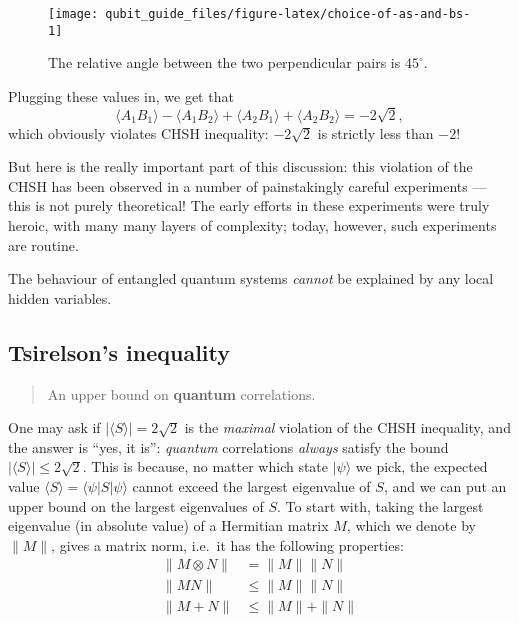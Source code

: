 \documentclass[fleqn]{article}
\newenvironment{idea}{\noindent}{\medskip}
\begin{document}
\begin{figure}[H]

{\centering \texttt{[image: qubit\_guide\_files/figure-latex/choice-of-as-and-bs-1]} 

}

\caption{The relative angle between the two perpendicular pairs is \(45^\circ\).}\label{fig:choice-of-as-and-bs}
\end{figure}

Plugging these values in, we get that
\[
  \langle A_1 B_1\rangle - \langle A_1 B_2\rangle + \langle A_2 B_1\rangle + \langle A_2 B_2\rangle
  = -2\sqrt{2},
\]
which obviously violates CHSH inequality: \(-2\sqrt{2}\) is strictly less than \(-2\)!

But here is the really important part of this discussion: this violation of the CHSH has been observed in a number of painstakingly careful experiments --- this is not purely theoretical!
The early efforts in these experiments were truly heroic, with many many layers of complexity; today, however, such experiments are routine.

\begin{idea}
The behaviour of entangled quantum systems \emph{cannot} be explained by any local hidden variables.

\end{idea}

\hypertarget{tsirelsons-inequality}{%
\subsection{Tsirelson's inequality}\label{tsirelsons-inequality}}

\begin{quote}
An upper bound on \textbf{quantum} correlations.
\end{quote}

One may ask if \(|\langle S\rangle|= 2\sqrt{2}\) is the \emph{maximal} violation of the CHSH inequality, and the answer is ``yes, it is'': \emph{quantum} correlations \emph{always} satisfy the bound \(|\langle S\rangle|\leqslant 2\sqrt{2}\).
This is because, no matter which state \(|\psi\rangle\) we pick, the expected value \(\langle S\rangle = \langle\psi|S|\psi\rangle\) cannot exceed the largest eigenvalue of \(S\), and we can put an upper bound on the largest eigenvalues of \(S\).
To start with, taking the largest eigenvalue (in absolute value) of a Hermitian matrix \(M\), which we denote by \(\|M\|\), gives a matrix norm, i.e.~it has the following properties:
\[
\begin{aligned}
  \|M\otimes N\|
  & = \|M\| \|N\|
\\\|MN\|
  & \leqslant\|M\| \|N\|
\\\|M+N\|
  & \leqslant\|M\| + \|N\|
\end{aligned}
\]
\end{document}
